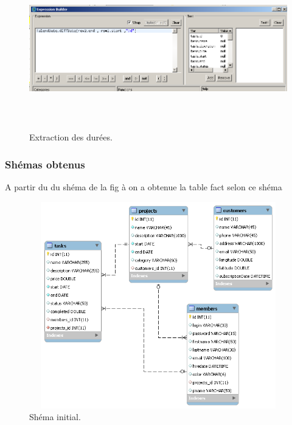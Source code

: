 \begin{figure}[H]
\center
\includegraphics[width=12cm,height=7cm]{./figures/integ2.png}
\caption{Extraction des  dur\'{e}es.}
\end{figure}



\newpage

\subsubsection{Sh\'{e}mas obtenus}
A partir du du sh\'{e}ma de la fig \`{a} on a obtenue la table fact selon ce shéma


\begin{figure}[H]
\center
\includegraphics[width=14cm,height=9cm]{./figures/s1.png}
\caption{Sh\'{e}ma initial.}
\end{figure}


